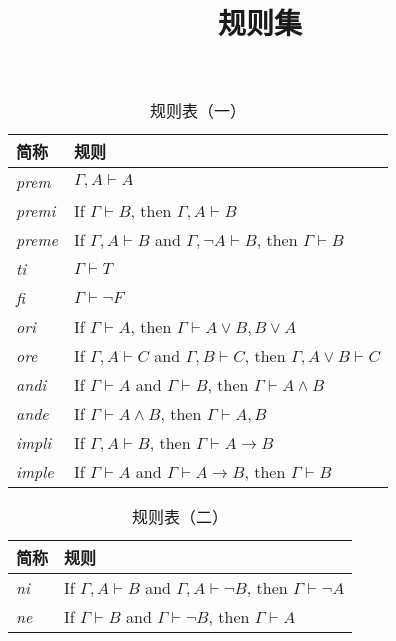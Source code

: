 \documentclass[12pt, a4paper]{article}
\title{规则集}
\date{}
\begin{document}
	\maketitle
	\begin{center}
		\begin{table}[htbp]
			\centering
			\caption{规则表（一）}
			\begin{tabular}{|l|l|}
				\hline 
				\textbf{简称}    & \textbf{规则} \\ \hline
				\textit{prem}  &  $\Gamma, A \vdash A$           \\ \hline
				\textit{premi} &  If $\Gamma \vdash B$, then $\Gamma, A \vdash B$           \\ \hline
				\textit{preme} & If $\Gamma, A \vdash B$ and $\Gamma, \neg A \vdash B$, then $\Gamma \vdash B$            \\ \hline
				\textit{ti}    &  $\Gamma \vdash T$           \\ \hline
				\textit{fi}    & $\Gamma \vdash \neg F$            \\ \hline
				\textit{ori}   & If $\Gamma \vdash A$, then $\Gamma \vdash A \lor B, B \lor A$            \\ \hline
				\textit{ore}   &  If $\Gamma, A\vdash C$ and $\Gamma, B \vdash C$, then $\Gamma, A \lor B \vdash C$           \\ \hline
				\textit{andi}  &  If $\Gamma \vdash A$ and $\Gamma \vdash B$, then $\Gamma \vdash A \land B$           \\ \hline
				\textit{ande}  & If $\Gamma \vdash A \land B$, then $\Gamma \vdash A, B$            \\ \hline
				\textit{impli}  & If $\Gamma, A \vdash B$, then $\Gamma \vdash A \to B$            \\ \hline
				\textit{imple}  & If $\Gamma \vdash A$ and $\Gamma \vdash A \to B$, then $\Gamma \vdash B$            \\ \hline
			\end{tabular}
		\end{table}
		\begin{table}[htbp]
			\centering
			\caption{规则表（二）}
			\begin{tabular}{|l|l|}
				\hline 
				\textbf{简称}    & \textbf{规则} \\ \hline
				\textit{ni}  & If $\Gamma, A\vdash B$ and $\Gamma, A \vdash \neg B$, then $\Gamma  \vdash \neg A$            \\ \hline
				\textit{ne}  & If $\Gamma \vdash B$ and $\Gamma \vdash \neg B$, then $\Gamma  \vdash A$             \\ \hline

\end{tabular}
\end{table}
\end{center}
\end{document}

